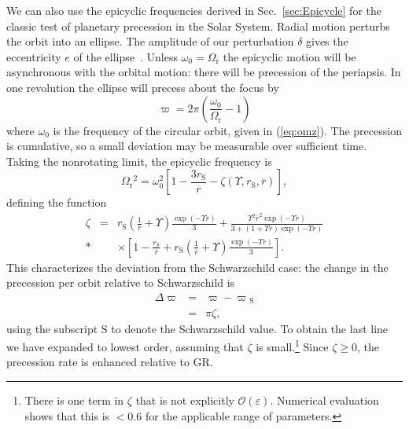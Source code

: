 \documentclass[aps,prd,amsfonts,amssymb,amsmath,nofootinbib,reprint,showpacs]{revtex4-1}
\newcommand{\eqnref}[1]{(\ref{eq:#1})}
\newcommand{\secref}[1]{Sec.\ \ref{sec:#1}}
\newcommand{\sub}[1]{\ensuremath{_\text{#1}}}
\newcommand{\recip}[1]{\ensuremath{\frac{1}{#1}}}
\newcommand{\order}[1]{\ensuremath{\mathcal{O}({#1})}}
\begin{document}
We can also use the epicyclic frequencies derived in \secref{Epicycle} for the classic test of planetary precession in the Solar System. Radial motion perturbs the orbit into an ellipse. The amplitude of our perturbation $\delta$ gives the eccentricity $e$ of the ellipse~\cite{Kerner2001a}. Unless $\omega_0 = \Omega\sub{r}$ the epicyclic motion will be asynchronous with the orbital motion: there will be precession of the periapsis. In one revolution the ellipse will precess about the focus by
\begin{equation}
\varpi = 2\pi\left(\frac{\omega_0}{\Omega\sub{r}} - 1\right)
\end{equation}
where $\omega_0$ is the frequency of the circular orbit, given in \eqnref{omz}. The precession is cumulative, so a small deviation may be measurable over sufficient time. Taking the nonrotating limit, the epicyclic frequency is
\begin{equation}
\Omega\sub{r}^2 = \omega_0^2 \left[1 - \frac{3r\sub{S}}{\overline{r}} - \zeta(\Upsilon,r\sub{S},\overline{r})\right],
\end{equation}
defining the function
\begin{eqnarray}
\zeta & = & r\sub{S}\left(\recip{\overline{r}} + \Upsilon\right)\frac{\exp(-\Upsilon r)}{3} + \frac{\Upsilon^2\overline{r}^2\exp(-\Upsilon r)}{3 + (1 + \Upsilon \overline{r})\exp(-\Upsilon r)} \nonumber \\*
& &  \times \left[1 - \frac{r\sub{S}}{\overline{r}} + r\sub{S}\left(\recip{\overline{r}} + \Upsilon\right)\frac{\exp(-\Upsilon r)}{3}\right].
\end{eqnarray}
This characterizes the deviation from the Schwarzschild case: the change in the precession per orbit relative to Schwarzschild is
\begin{eqnarray}
\Delta \varpi & = & \varpi - \varpi\sub{S} \\
 & = & \pi\zeta,
\end{eqnarray}
using the subscript $\text{S}$ to denote the Schwarzschild value. To obtain the last line we have expanded to lowest order, assuming that $\zeta$ is small.\footnote{There is one term in $\zeta$ that is not explicitly $\order{\varepsilon}$. Numerical evaluation shows that this is $< 0.6$ for the applicable range of parameters.} Since $\zeta \geq 0$, the precession rate is enhanced relative to GR.
\end{document}
